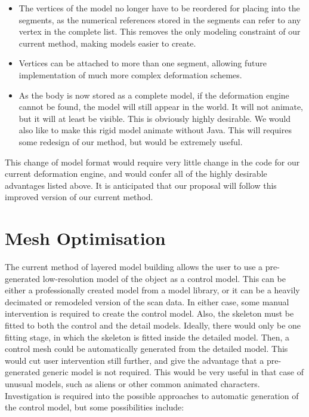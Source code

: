 \documentclass[10pt,oneside,fleqn,a4paper]{book}
\begin{document}
\begin{itemize}
\item The vertices of the model no longer have to be reordered for placing into the segments, as the numerical references stored in the segments can refer to any vertex in the complete list. This removes the only modeling constraint of our current method, making models easier to create.
\item Vertices can be attached to more than one segment, allowing future implementation of much more complex deformation schemes.
\item As the body is now stored as a complete model, if the deformation engine cannot be found, the model will still appear in the world. It will not animate, but it will at least be visible. This is obviously highly desirable. We would also like to make this rigid model animate without Java. This will requires some redesign of our method, but would be extremely useful.
\end{itemize}

This change of model format would require very little change in the code for our current deformation engine, and would confer all of the highly desirable advantages listed above. It is anticipated that our proposal will follow this improved version of our current method.

\section{\label{sec:futuremesh}Mesh Optimisation}
The current method of layered model building allows the user to use a pre-generated low-resolution model of the object as a control model. This can be either a professionally created model from a model library, or it can be a heavily decimated or remodeled version of the scan data. In either case, some manual intervention is required to create the control model. Also, the skeleton must be fitted to both the control and the detail models. Ideally, there would only be one fitting stage, in which the skeleton is fitted inside the detailed model. Then, a control mesh could be automatically generated from the detailed model. This would cut user intervention still further, and give the advantage that a pre-generated generic model is not required. This would be very useful in that case of unusual models, such as aliens or other common animated characters. Investigation is required into the possible approaches to automatic generation of the control model, but some possibilities include:
\end{document}
